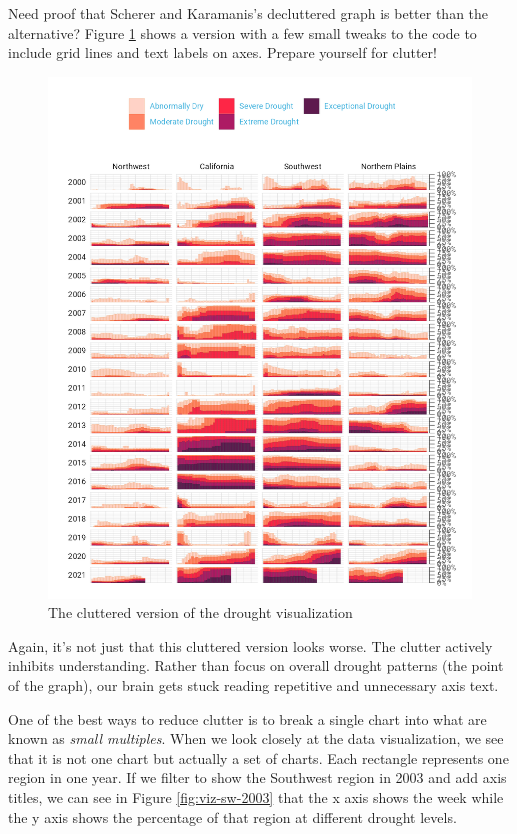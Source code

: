 \documentclass[
]{book}
\begin{document}
Need proof that Scherer and Karamanis's decluttered graph is better than the alternative? Figure \ref{fig:cluttered-viz} shows a version with a few small tweaks to the code to include grid lines and text labels on axes. Prepare yourself for clutter!

\begin{figure}
\includegraphics[width=1\linewidth]{data-viz_files/figure-latex/cluttered-viz-1} \caption{The cluttered version of the drought visualization}\label{fig:cluttered-viz}
\end{figure}

Again, it's not just that this cluttered version looks worse. The clutter actively inhibits understanding. Rather than focus on overall drought patterns (the point of the graph), our brain gets stuck reading repetitive and unnecessary axis text.

One of the best ways to reduce clutter is to break a single chart into what are known as \emph{small multiples}. When we look closely at the data visualization, we see that it is not one chart but actually a set of charts. Each rectangle represents one region in one year. If we filter to show the Southwest region in 2003 and add axis titles, we can see in Figure \ref{fig:viz-sw-2003} that the x axis shows the week while the y axis shows the percentage of that region at different drought levels.
\end{document}
